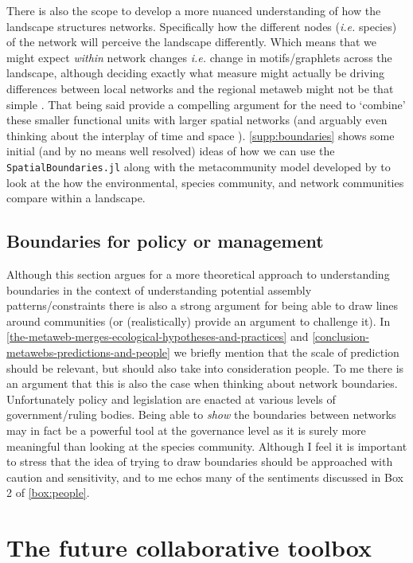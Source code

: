 There is also the scope to develop a more nuanced understanding of how
the landscape structures networks. Specifically how the different nodes
(\emph{i.e.} species) of the network will perceive the landscape
differently. Which means that we might expect \emph{within} network
changes \emph{i.e.} change in motifs/graphlets across the landscape, although deciding exactly what measure might actually be driving differences between local networks and the regional metaweb might not be that simple \cite{Saravia2022Ecological}. That being said \cite{Fortin2021NetEcoa} provide a compelling argument for the need to `combine' these smaller functional units with larger spatial networks (and arguably even thinking about the interplay of time and space \cite{Estay2023Editorial}). \autoref{supp:boundaries} shows some initial (and by no means well resolved) ideas of how we can use the \texttt{SpatialBoundaries.jl} along with the metacommunity model developed by \cite{Thompson2017Dispersal} to look at the how the environmental, species community, and network communities compare within a landscape.

\subsection{Boundaries for policy or management}

Although this section argues for a more theoretical approach to understanding boundaries in the context of understanding potential assembly patterns/constraints there is also a strong argument for being able to draw lines around communities (or (realistically) provide an argument to challenge it). In \autoref{the-metaweb-merges-ecological-hypotheses-and-practices} and \autoref{conclusion-metawebs-predictions-and-people} we briefly mention that the scale of prediction should be relevant, but should also take into consideration people. To me there is an argument that this is also the case when thinking about network boundaries. Unfortunately policy and legislation are enacted at various levels of government/ruling bodies. Being able to \emph{show} the boundaries between networks may in fact be a powerful tool at the governance level as it is surely more meaningful than looking at the species community. Although I feel it is important to stress that the idea of trying to draw boundaries should be approached with caution and sensitivity, and to me echos many of the sentiments discussed in Box 2 of \autoref{box:people}.

\section{The future collaborative toolbox}

